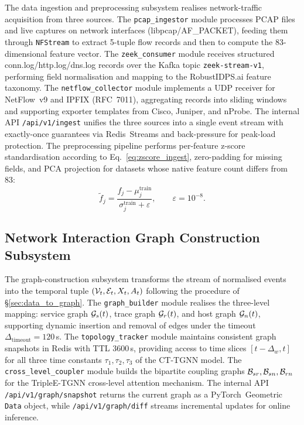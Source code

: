 The data ingestion and preprocessing subsystem realises network-traffic acquisition from three sources. The \texttt{pcap\_ingestor} module processes PCAP files and live captures on network interfaces (libpcap/AF\_PACKET), feeding them through \texttt{NFStream} to extract 5-tuple flow records and then to compute the 83-dimensional feature vector. The \texttt{zeek\_consumer} module receives structured conn.log/http.log/dns.log records over the Kafka topic \texttt{zeek-stream-v1}, performing field normalisation and mapping to the RobustIDPS.ai feature taxonomy. The \texttt{netflow\_collector} module implements a UDP receiver for NetFlow~v9 and IPFIX (RFC~7011), aggregating records into sliding windows and supporting exporter templates from Cisco, Juniper, and nProbe. The internal API \texttt{/api/v1/ingest} unifies the three sources into a single event stream with exactly-once guarantees via Redis~Streams and back-pressure for peak-load protection. The preprocessing pipeline performs per-feature z-score standardisation according to Eq.~\eqref{eq:zscore_ingest}, zero-padding for missing fields, and PCA projection for datasets whose native feature count differs from 83:
\begin{equation}
\tilde{f}_j = \frac{f_j - \mu_j^{\mathrm{train}}}{\sigma_j^{\mathrm{train}} + \varepsilon}, \qquad \varepsilon=10^{-8}.
\label{eq:zscore_ingest}
\end{equation}

\subsection{Network Interaction Graph Construction Subsystem}
\label{subsec:func_graph}

The graph-construction subsystem transforms the stream of normalised events into the temporal tuple $(\mathcal{V}_t,\mathcal{E}_t,X_t,A_t)$ following the procedure of \S\ref{sec:data_to_graph}. The \texttt{graph\_builder} module realises the three-level mapping: service graph $\mathcal{G}_s(t)$, trace graph $\mathcal{G}_r(t)$, and host graph $\mathcal{G}_n(t)$, supporting dynamic insertion and removal of edges under the timeout $\Delta_{\mathrm{timeout}}=120$\,s. The \texttt{topology\_tracker} module maintains consistent graph snapshots in Redis with TTL 3600\,s, providing access to time slices $[t-\Delta_w,t]$ for all three time constants $\tau_1,\tau_2,\tau_3$ of the CT-TGNN model. The \texttt{cross\_level\_coupler} module builds the bipartite coupling graphs $\mathcal{B}_{sr},\mathcal{B}_{sn},\mathcal{B}_{rn}$ for the TripleE-TGNN cross-level attention mechanism. The internal API \texttt{/api/v1/graph/snapshot} returns the current graph as a PyTorch~Geometric \texttt{Data} object, while \texttt{/api/v1/graph/diff} streams incremental updates for online inference.

